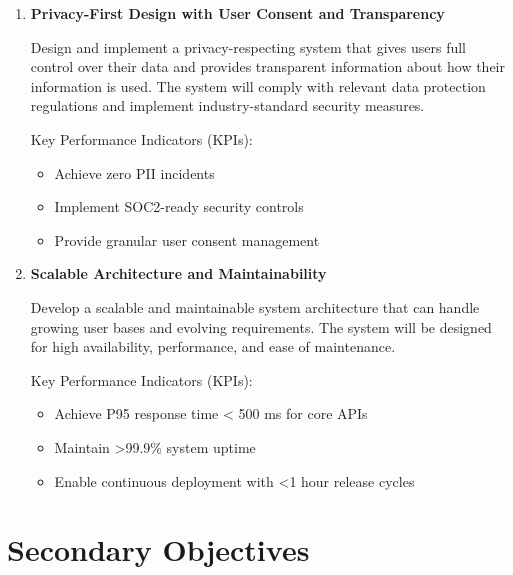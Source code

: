 \documentclass[12pt,a4paper]{report}
\begin{document}
\begin{enumerate}[label=\textbf{O\arabic*.}, align=left]
    Key Performance Indicators (KPIs):
    \begin{itemize}
        \item Achieve >50\% accurate autofill for common application fields
        \item Reduce average application completion time by 60-80\%
        \item Provide real-time application status updates across platforms
    \end{itemize}
    
    \item \textbf{Privacy-First Design with User Consent and Transparency}
    
    Design and implement a privacy-respecting system that gives users full control over their data and provides transparent information about how their information is used. The system will comply with relevant data protection regulations and implement industry-standard security measures.
    
    Key Performance Indicators (KPIs):
    \begin{itemize}
        \item Achieve zero PII incidents
        \item Implement SOC2-ready security controls
        \item Provide granular user consent management
    \end{itemize}
    
    \item \textbf{Scalable Architecture and Maintainability}
    
    Develop a scalable and maintainable system architecture that can handle growing user bases and evolving requirements. The system will be designed for high availability, performance, and ease of maintenance.
    
    Key Performance Indicators (KPIs):
    \begin{itemize}
        \item Achieve P95 response time < 500 ms for core APIs
        \item Maintain >99.9\% system uptime
        \item Enable continuous deployment with <1 hour release cycles
    \end{itemize}
\end{enumerate}

\section*{Secondary Objectives}
\end{document}
